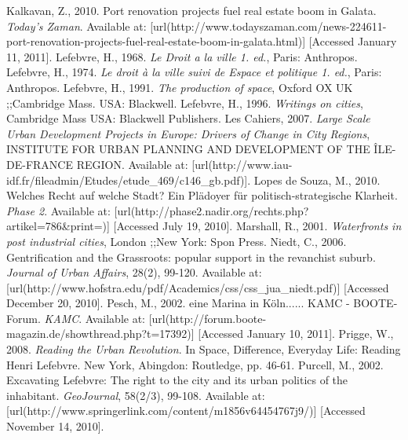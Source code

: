 {\nl%
Kalkavan, Z., 2010. Port renovation projects fuel real estate boom in Galata. {\em Today's Zaman}. Available at:  [url(http://www.todayszaman.com/news-224611-port-renovation-projects-fuel-real-estate-boom-in-galata.html)] [Accessed January 11, 2011].%
\nl%
Lefebvre, H., 1968. {\em Le Droit a la ville 1. ed.}, Paris: Anthropos.%
\nl%
Lefebvre, H., 1974. {\em Le droit à la ville suivi de Espace et politique 1. ed.}, Paris: Anthropos.%
\nl%
Lefebvre, H., 1991. {\em The production of space}, Oxford  OX  UK ;;Cambridge  Mass.  USA: Blackwell.%
\nl%
Lefebvre, H., 1996. {\em Writings on cities}, Cambridge  Mass  USA: Blackwell Publishers.%
\nl%
Les Cahiers, 2007. {\em Large Scale Urban Development Projects in Europe: Drivers of Change in City Regions}, INSTITUTE FOR URBAN PLANNING AND DEVELOPMENT OF THE ÎLE-DE-FRANCE REGION. Available at:  [url(http://www.iau-idf.fr/fileadmin/Etudes/etude_469/c146_gb.pdf)].%
\nl%
Lopes de Souza, M., 2010. Welches Recht auf welche Stadt? Ein Plädoyer für politisch-strategische Klarheit. {\em Phase 2}. Available at:  [url(http://phase2.nadir.org/rechts.php?artikel=786&print=)] [Accessed July 19, 2010].%
\nl%
Marshall, R., 2001. {\em Waterfronts in post industrial cities}, London ;;New York: Spon Press.%
\nl%
Niedt, C., 2006. Gentrification and the Grassroots: popular support in the revanchist suburb. {\em Journal of Urban Affairs}, 28(2), 99-120. Available at:  [url(http://www.hofstra.edu/pdf/Academics/css/css_jua_niedt.pdf)] [Accessed December 20, 2010].%
\nl%
Pesch, M., 2002. eine Marina in Köln...... KAMC - BOOTE-Forum. {\em KAMC}. Available at:  [url(http://forum.boote-magazin.de/showthread.php?t=17392)] [Accessed January 10, 2011].%
\nl%
Prigge, W., 2008. {\em Reading the Urban Revolution}. In Space, Difference, Everyday Life: Reading Henri Lefebvre.  New York, Abingdon: Routledge, pp. 46-61.%
\nl%
Purcell, M., 2002. Excavating Lefebvre: The right to the city and its urban politics of the inhabitant. {\em GeoJournal}, 58(2/3), 99-108. Available at:  [url(http://www.springerlink.com/content/m1856v64454767j9/)] [Accessed November 14, 2010].%
}
